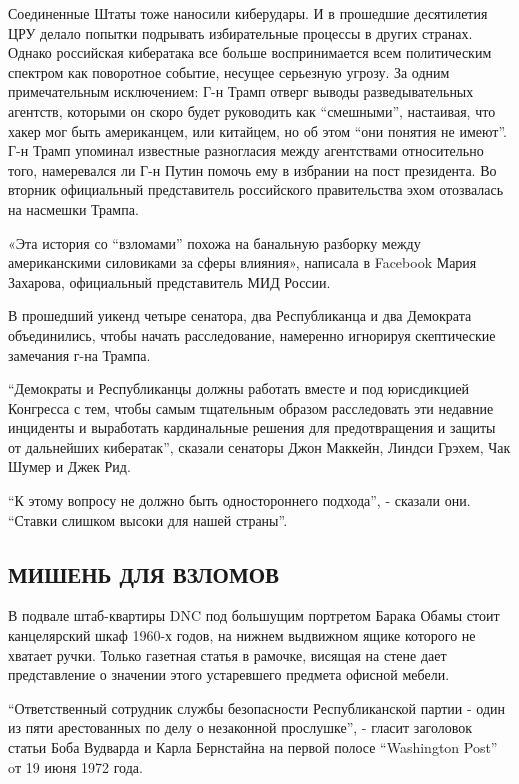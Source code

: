 Соединенные Штаты тоже наносили киберудары. И в прошедшие десятилетия
ЦРУ делало попытки подрывать избирательные процессы в других странах.
Однако российская кибератака все больше воспринимается всем политическим
спектром как поворотное событие, несущее серьезную угрозу. За одним
примечательным исключением: Г-н Трамп отверг выводы разведывательных
агентств, которыми он скоро будет руководить как ``смешными'',
настаивая, что хакер мог быть американцем, или китайцем, но об этом
``они понятия не имеют''. Г-н Трамп упоминал известные разногласия между
агентствами относительно того, намеревался ли Г-н Путин помочь ему в
избрании на пост президента. Во вторник официальный представитель
российского правительства эхом отозвалась на насмешки Трампа.

«Эта история со ``взломами'' похожа на банальную разборку между
американскими силовиками за сферы влияния», написала в Facebook Мария
Захарова, официальный представитель МИД России.

В прошедший уикенд четыре сенатора, два Республиканца и два Демократа
объединились, чтобы начать расследование, намеренно игнорируя
скептические замечания г-на Трампа.

``Демократы и Республиканцы должны работать вместе и под юрисдикцией
Конгресса с тем, чтобы самым тщательным образом расследовать эти
недавние инциденты и выработать кардинальные решения для предотвращения
и защиты от дальнейших кибератак'', сказали сенаторы Джон Маккейн,
Линдси Грэхем, Чак Шумер и Джек Рид.

``К этому вопросу не должно быть одностороннего подхода'', - сказали
они. ``Ставки слишком высоки для нашей страны''.

\hypertarget{ux43cux438ux448ux435ux43dux44c-ux434ux43bux44f-ux432ux437ux43bux43eux43cux43eux432}{%
\subsection{\texorpdfstring{\textbf{МИШЕНЬ ДЛЯ
ВЗЛОМОВ}}{МИШЕНЬ ДЛЯ ВЗЛОМОВ}}\label{ux43cux438ux448ux435ux43dux44c-ux434ux43bux44f-ux432ux437ux43bux43eux43cux43eux432}}

В подвале штаб-квартиры DNC под большущим портретом Барака Обамы стоит
канцелярский шкаф 1960-х годов, на нижнем выдвижном ящике которого не
хватает ручки. Только газетная статья в рамочке, висящая на стене дает
представление о значении этого устаревшего предмета офисной мебели.

``Ответственный сотрудник службы безопасности Республиканской партии -
один из пяти арестованных по делу о незаконной прослушке'', - гласит
заголовок статьи Боба Вудварда и Карла Бернстайна на первой полосе
``Washington Post'' oт 19 июня 1972 года.

